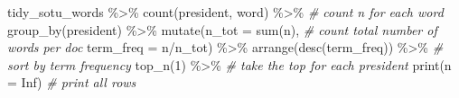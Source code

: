 \documentclass[
]{book}
\newenvironment{Shaded}{\begin{snugshade}}{\end{snugshade}}
\newcommand{\AttributeTok}[1]{\textcolor[rgb]{0.77,0.63,0.00}{#1}}
\newcommand{\CommentTok}[1]{\textcolor[rgb]{0.56,0.35,0.01}{\textit{#1}}}
\newcommand{\ConstantTok}[1]{\textcolor[rgb]{0.00,0.00,0.00}{#1}}
\newcommand{\DecValTok}[1]{\textcolor[rgb]{0.00,0.00,0.81}{#1}}
\newcommand{\FunctionTok}[1]{\textcolor[rgb]{0.00,0.00,0.00}{#1}}
\newcommand{\NormalTok}[1]{#1}
\newcommand{\SpecialCharTok}[1]{\textcolor[rgb]{0.00,0.00,0.00}{#1}}
\begin{document}
\begin{Shaded}
\begin{Highlighting}[]
\NormalTok{tidy\_sotu\_words }\SpecialCharTok{\%\textgreater{}\%}
  \FunctionTok{count}\NormalTok{(president, word)  }\SpecialCharTok{\%\textgreater{}\%}  \CommentTok{\# count n for each word}
  \FunctionTok{group\_by}\NormalTok{(president) }\SpecialCharTok{\%\textgreater{}\%} 
  \FunctionTok{mutate}\NormalTok{(}\AttributeTok{n\_tot =} \FunctionTok{sum}\NormalTok{(n), }\CommentTok{\# count total number of words per doc}
         \AttributeTok{term\_freq =}\NormalTok{ n}\SpecialCharTok{/}\NormalTok{n\_tot) }\SpecialCharTok{\%\textgreater{}\%} 
  \FunctionTok{arrange}\NormalTok{(}\FunctionTok{desc}\NormalTok{(term\_freq)) }\SpecialCharTok{\%\textgreater{}\%} \CommentTok{\# sort by term frequency}
  \FunctionTok{top\_n}\NormalTok{(}\DecValTok{1}\NormalTok{) }\SpecialCharTok{\%\textgreater{}\%}  \CommentTok{\# take the top for each president}
  \FunctionTok{print}\NormalTok{(}\AttributeTok{n =} \ConstantTok{Inf}\NormalTok{) }\CommentTok{\# print all rows}
\end{Highlighting}
\end{Shaded}
\end{document}
